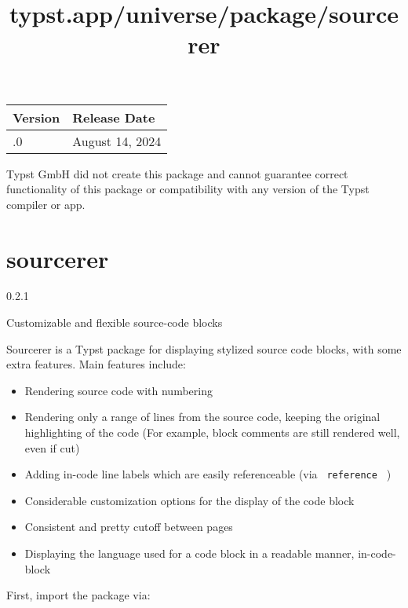 \begin{longtable}[]{@{}ll@{}}
\toprule\noalign{}
Version & Release Date \\
\midrule\noalign{}
\endhead
\bottomrule\noalign{}
\endlastfoot
0.1.0 & August 14, 2024 \\
\end{longtable}

Typst GmbH did not create this package and cannot guarantee correct
functionality of this package or compatibility with any version of the
Typst compiler or app.


\title{typst.app/universe/package/sourcerer}

\label{banner}
\section{sourcerer}\label{sourcerer}

{ 0.2.1 }

Customizable and flexible source-code blocks

\label{readme}
Sourcerer is a Typst package for displaying stylized source code blocks,
with some extra features. Main features include:

\begin{itemize}
\tightlist
\item
  Rendering source code with numbering
\item
  Rendering only a range of lines from the source code, keeping the
  original highlighting of the code (For example, block comments are
  still rendered well, even if cut)
\item
  Adding in-code line labels which are easily referenceable (via
  \texttt{\ reference\ } )
\item
  Considerable customization options for the display of the code block
\item
  Consistent and pretty cutoff between pages
\item
  Displaying the language used for a code block in a readable manner,
  in-code-block
\end{itemize}

First, import the package via:

\begin{Shaded}
\begin{Highlighting}[]
\end{Highlighting}
\end{Shaded}

